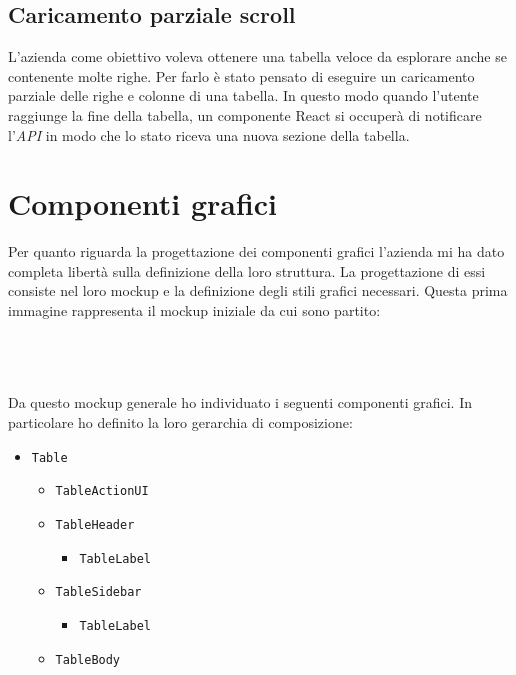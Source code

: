 \subsection*{Caricamento parziale scroll}
L'azienda come obiettivo voleva ottenere una tabella veloce da esplorare anche se contenente molte righe. Per farlo è stato pensato di eseguire un caricamento parziale delle righe e colonne di una tabella. In questo modo quando l'utente raggiunge la fine della tabella, un componente React si occuperà di notificare l'\emph{API} in modo che lo stato riceva una nuova sezione della tabella.

\section{Componenti grafici}
Per quanto riguarda la progettazione dei componenti grafici l'azienda mi ha dato completa libertà sulla definizione della loro struttura. La progettazione di essi consiste nel loro mockup e la definizione degli stili grafici necessari. Questa prima immagine rappresenta il mockup iniziale da cui sono partito: 
\\
\\
\begin{minipage}{\linewidth}
\end{minipage}
\mbox{} 
\\
\\
Da questo mockup generale ho individuato i seguenti componenti grafici. In particolare ho definito la loro gerarchia di composizione:
\begin{itemize}
	\item \verb|Table|
	\begin{itemize}
		\item \verb|TableActionUI|
		\item \verb|TableHeader|
		\begin{itemize}
			\item \verb|TableLabel|
		\end{itemize}
		\item \verb|TableSidebar|
		\begin{itemize}
			\item \verb|TableLabel|
		\end{itemize}
		\item \verb|TableBody|
	\end{itemize}
\end{itemize}

